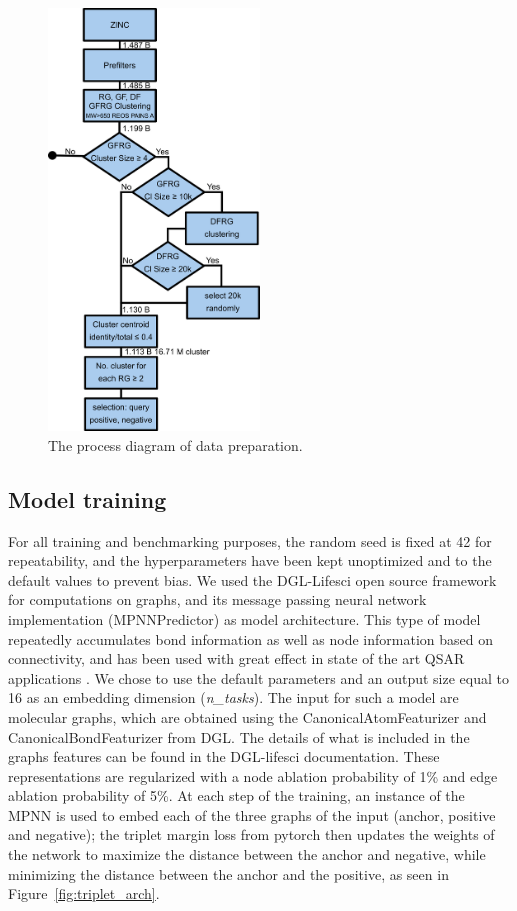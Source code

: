 \documentclass[journal=jacsat,manuscript=article]{achemso}
\begin{document}
\begin{figure}[hbtp]
\centering
\includegraphics[width=0.5\textwidth]{data/Process_Diagram.png}
\caption{The process diagram of data preparation.}
\label{fig:Process_Diagram}
\end{figure}

\subsection{Model training}
For all training and benchmarking purposes, the random seed is fixed at 42 for repeatability, and the hyperparameters have been kept unoptimized and to the default values to prevent bias. We used the DGL-Lifesci open source framework for computations on graphs, and its message passing neural network implementation (MPNNPredictor)\cite{gilmer2017neural} as model architecture. This type of model repeatedly accumulates bond information as well as node information based on connectivity, and has been used with great effect in state of the art QSAR applications \cite{yang2019analyzing}. We chose to use the default parameters and an output size equal to 16 as an embedding dimension (\textit{n\_tasks}). The input for such a model are molecular graphs, which are obtained using the CanonicalAtomFeaturizer and CanonicalBondFeaturizer from DGL. The details of what is included in the graphs features can be found in the DGL-lifesci documentation\cite{CanonicalAtomFeaturizer, CanonicalBondFeaturizer}. These representations are regularized with a node ablation probability of 1\% and edge ablation probability of 5\%. At each step of the training, an instance of the MPNN is used to embed each of the three graphs of the input (anchor, positive and negative); the triplet margin loss from pytorch\cite{NEURIPS2019_9015} then updates the weights of the network to maximize the distance between the anchor and negative, while minimizing the distance between the anchor and the positive, as seen in Figure~\ref{fig:triplet_arch}.
\end{document}
